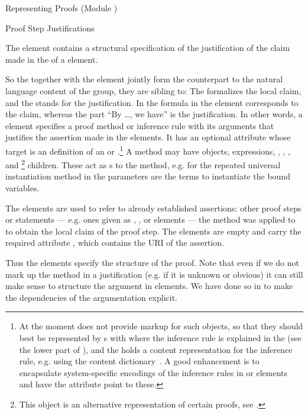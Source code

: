 \begin{omgroup}[id=proofs,short=Representing Proofs]{Representing Proofs (Module {})}
\begin{module}[id=justifications]
\begin{omgroup}[id=proofs.justifications]{Proof Step Justifications}
\begin{definition}[id=method.def]
  The {} element contains a structural specification of the justification of
  the claim made in the  of a  element.
\end{definition}
So the  together with the  element jointly form the
counterpart to the natural language content of the  group, they are sibling
to: The  formalizes the local claim, and the  stands for
the justification. In {} the formula in the  element
corresponds to the claim, whereas the part ``By \ldots, we have'' is the justification. In
other words, a  element specifies a proof method or inference rule with
its arguments that justifies the assertion made in the  elements.  It has
an optional  attribute whose target is an \omdoc definition of
an {} or {}.\footnote{At the moment
  \omdoc does not provide markup for such objects, so that they should best be
  represented by s with  where the inference rule
  is explained in the  (see the lower part of {}), and the
   holds a content representation for the inference rule, e.g.  using the
  content dictionary~\cite{CD:inference-rules}.  A good enhancement is to encapsulate
  system-specific encodings of the inference rules in  or
   elements and have the  attribute point to
  these.} A method may have {\openmath} objects, {\cmathml} expressions,
, , , and
\footnote{This object is an alternative representation of certain
  proofs, see .} children.  These act as {}s to
the method, e.g. for the repeated universal instantiation method in {}
the parameters are the terms to instantiate the bound variables.
  
\begin{definition}[id=premise.def]
  The {} elements are used to refer to already established assertions:
  other proof steps or statements --- e.g. ones given as ,
  , or  elements --- the method was applied to to
  obtain the local claim of the proof step. The  elements are empty and
  carry the required attribute , which contains the URI of the
  assertion.
\end{definition}
Thus the  elements specify the {} structure of the
proof. Note that even if we do not mark up the method in a justification (e.g. if it is
unknown or obvious) it can still make sense to structure the argument in
 elements. We have done so in {} to make
the dependencies of the argumentation explicit.
  

\end{omgroup}
\end{module}
\end{omgroup}
